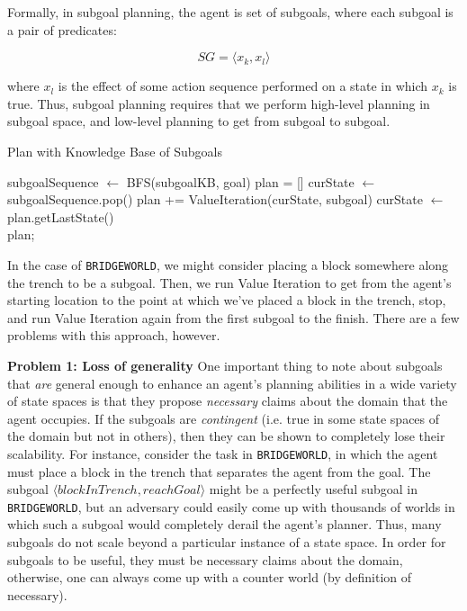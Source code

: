 \documentclass[]{article}
\begin{document}
Formally, in subgoal planning, the agent is set of subgoals, where each subgoal is a pair of predicates:

\[ 
SG = \langle x_k, x_l \rangle
\]

where $x_l$ is the effect of some action sequence performed on 
a state in which $x_k$ is true. Thus, subgoal planning requires 
that we perform high-level planning in subgoal space, and low-level 
planning to get from subgoal to subgoal.

\begin{algorithm}
  \caption{Plan with Knowledge Base of Subgoals}
  \begin{algorithmic}[1]
    \State subgoalSequence $\gets$ BFS(subgoalKB, goal)
    \State plan = []
    \State curState $\gets$ subgoalSequence.pop()
    		\State plan += ValueIteration(curState, subgoal)
		\State curState $\gets$ plan.getLastState()
    \EndFor \\
    \Return plan;
  \end{algorithmic}
\end{algorithm}

In the case of \texttt{BRIDGEWORLD}, we might consider placing 
a block somewhere along the trench to be a subgoal. Then, we 
run Value Iteration to get from the agent's starting location to the 
point at which we've placed a block in the trench, stop, and run 
Value Iteration again from the first subgoal to the finish. There are 
a few problems with this approach, however.


{\bf Problem 1: Loss of generality}  One important thing to note about subgoals 
that {\it are} general enough to enhance an agent's planning abilities in a wide 
variety of state spaces is that they propose {\it necessary} claims about the 
domain that the agent occupies. If the subgoals are {\it contingent} (i.e. true in 
some state spaces of the domain but not in others), then they can be shown to 
completely lose their scalability. For instance, consider the task in \texttt{BRIDGEWORLD}, 
in which the agent must place a block in the trench that separates the agent from the goal. 
The subgoal $\langle blockInTrench, reachGoal\rangle$ might be a perfectly useful 
subgoal in \texttt{BRIDGEWORLD}, but an adversary could easily come up with 
thousands of worlds in which such a subgoal would completely derail the agent's 
planner. Thus, many subgoals do not scale beyond a particular instance of a state 
space. In order for subgoals to be useful, they must be necessary claims about the 
domain, otherwise, one can always come up with a counter world (by definition of necessary). 
\end{document}
